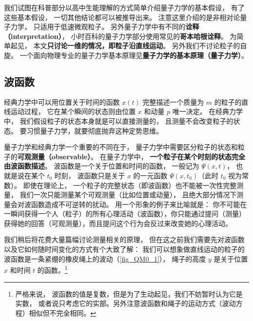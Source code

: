 

我们试图在科普部分以高中生能理解的方式简单介绍量子力学的基本假设， 有了这些基本假设， 一切其他结论都可以被推导出来。 注意这里介绍的是非相对论量子力学， 只适用于低速微观粒子。 另外量子力学中有不同的\textbf{诠释（interpretation）}， 小时百科的量子力学部分使用常见的\textbf{哥本哈根诠释}。 为简单起见， 本文\textbf{只讨论一维的情况，即粒子沿直线运动}。 另外我们不讨论粒子的自旋。 一个面向物理专业的量子力学基本原理见\textbf{量子力学的基本原理（量子力学）}。%

\subsection{波函数}

经典力学中可以用位置关于时间的函数 $x(t)$ 完整描述一个质量为 $m$ 的粒子的直线运动过程， 它在某个瞬间的状态则由位置 $x$ 和动量 $p$ 唯一决定。 在经典力学中， 我们假设粒子的状态本身就是可以直接测量的， 且测量不会改变粒子的状态。 要习惯量子力学，就要彻底抛弃这种定势思维。

量子力学和经典力学一个重要的不同在于， 量子力学中需要区分粒子的状态和粒子的\textbf{可观测量（observable）}。 在量子力学中， \textbf{一个粒子在某个时刻的状态完全由波函数描述}。 波函数是一个关于位置和时间的函数， 一般记为 $\Psi(x, t)$， 也就是说在某个 $t_0$ 时刻， 波函数只是关于 $x$ 的一元函数 $\Psi(x, t_0)$（此时 $t_0$ 视为常数）。 即使在理论上， 一个粒子的完整状态（即波函数）也不能被一次性完整测量， 我们一次只能测量某个可观测量（比如位置或动量）， 且绝大部分情况下测量会对波函数造成不可逆转的扰动。 用一个形象的例子来比喻就是： 你不可能在一瞬间获得一个人（粒子）的所有心理活动（波函数），你只能通过提问（测量）获得她的回答（可观测量），而且提问这个行为会反过来改变她的心理活动。

我们稍后将花费大量篇幅讨论测量相关的原理， 但在这之前我们需要先对波函数以及它如何随时间变化的方式有个大致了解： 我们可以想象做直线运动的粒子的波函数是一条紧绷的橡皮绳上的波动（\autoref{fig_QM0_1}）， 绳子的高度 $y$ 是关于位置 $x$ 和时间 $t$ 的函数。\footnote{严格来说， 波函数的值是复数，但是为了生动起见，我们不妨暂时认为它是实数， 或者说只考虑它的实部。另外注意波函数和绳子的运动方式（波动方程）相似但不完全相同。}

